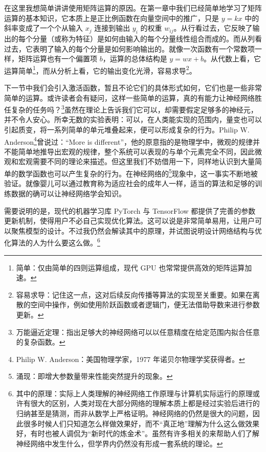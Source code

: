 在这里我想简单讲讲使用矩阵运算的原因。在第一章中我们已经简单地学习了矩阵运算的基本知识，它本质上是正比例函数在向量空间中的推广，只是 $y=kx$ 中的斜率变成了一个个从输入 $x_j$ 连接到输出 $y_i$ 的权重 $w_{ij}$。从行看过去，它反映了输出的每个分量（或称为特征）是如何由输入的每个分量线性组合而成的。而从列看过去，它表明了输入的每个分量是如何影响输出的。就像一次函数有一个常数项一样，矩阵运算也有一个偏置项 $b$，运算的总体结构是 $y = wx + b$。从代数上看，它运算简单\footnote{简单：仅由简单的四则运算组成，现代 GPU 也常常提供高效的矩阵运算加速。}，而从分析上看，它的输出变化光滑，容易求导\footnote{容易求导：记住这一点，这对后续反向传播等算法的实现至关重要。如果在离散的空间中操作，例如使用阶跃函数或者逻辑门，便无法借助导数来进行参数更新。}。

下一节中我们会引入激活函数，暂且不论它们的具体形式如何，它们也是一些非常简单的运算。或许读者会有疑问，这样一些简单的运算，真的有能力让神经网络胜任复杂的任务吗？\footnote{万能逼近定理：指出足够大的神经网络可以以任意精度在给定范围内拟合任意的复杂函数。}虽然在理论上告诉我们它可以，却需要假定足够多的神经元，并不令人安心。所幸无数的实验表明：可以，在人类能实现的范围内，量变也可以引起质变，将一系列简单的单元堆叠起来，便可以形成复杂的行为。Philip W. Anderson\footnote{Philip W. Anderson：美国物理学家，1977 年诺贝尔物理学奖获得者。}曾说过：“More is different”，他的原意指的是物理学中，微观的规律并不能简单地推导出宏观的规律，整个系统可以表现的与单个元素完全不同，因此微观和宏观需要不同的理论来描述。但这里我们不妨借用一下，同样地认识到大量简单的数学函数也可以产生复杂的行为。在神经网络的\footnote{涌现：即增大参数量带来性能突然提升的现象。}现象中，这一事实不断地被验证。就像婴儿可以通过教育称为适应社会的成年人一样，适当的算法和足够的训练数据的确可以让神经网络学会知识。

需要说明的是，现代的机器学习库 PyTorch 与 TensorFlow 都提供了完善的参数更新机制，使得用户不必自己实现优化算法。这可以说是非常简单易用，让用户可以聚焦模型的设计。不过我仍然会解读其中的原理，并试图说明设计网络结构与优化算法的人为什么要这么做。\footnote{其中的原理：实际上人类理解的神经网络工作原理与计算机实际运行的原理或许有很大的区别，人类对现在大部分网络的理解本质上都是经过实验后进行的归纳甚至是猜测，而非从数学上严格证明。神经网络的仍然是很大的问题，因此很多时候人们只知道怎么样做效果好，而不“真正地”理解为什么这么做效果好，有时也被人调侃为“新时代的炼金术”。虽然有许多相关的来帮助人们了解神经网络中发生什么，但学界内仍然没有形成一套系统的理论。}


